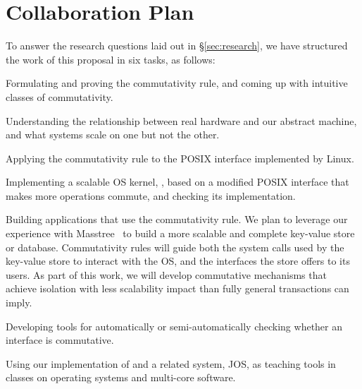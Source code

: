 \section{Collaboration Plan}
\label{sec:collabplan}


To answer the research questions laid out in \S\ref{sec:research},
we have structured the work of this proposal in six tasks, as follows:

\begin{CompactItemize}

\item Formulating and proving the commutativity rule, and
  coming up with intuitive classes of commutativity.

\item Understanding the relationship between real hardware
  and our abstract machine, and what systems scale on one
  but not the other.

\item Applying the commutativity rule to the POSIX interface
  implemented by Linux.

\item Implementing a scalable OS kernel, \sys, based on a modified
  POSIX interface that makes more operations commute, and
  checking its implementation.

\item Building applications that use the commutativity rule. We plan
  to leverage our experience with Masstree~\cite{mao:masstree} to
  build a more scalable and complete key-value store or database.
  Commutativity rules will guide both the system calls used by the
  key-value store to interact with the OS, and the interfaces the
  store offers to its users. As part of this work, we will develop
  commutative mechanisms that achieve isolation with less scalability
  impact than fully general transactions can imply.

\item Developing tools for automatically or semi-automatically
  checking whether an interface is commutative.

\item Using our implementation of \sys and a related system, JOS, as teaching tools in
  classes on operating systems and multi-core software.

\end{CompactItemize}


